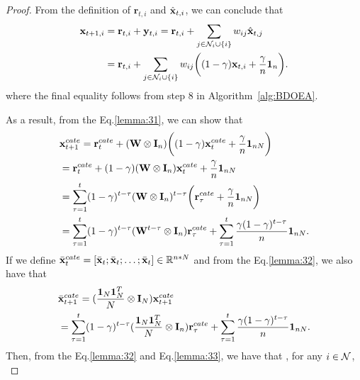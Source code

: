 		\begin{proof}
		From the definition of $\mathbf{r}_{t,i}$ and $\hat{\mathbf{x}}_{t,i}$, we can conclude that 
		\begin{equation}\label{lemma:31}
			\begin{aligned}
				\mathbf{x}_{t+1,i}&=\mathbf{r}_{t,i}+\mathbf{y}_{t,i}=\mathbf{r}_{t,i}+\sum_{j\in\mathcal{N}_{i}\cup\{i\}}w_{ij}\hat{\mathbf{x}}_{t,j}\\
				&=\mathbf{r}_{t,i}+\sum_{j\in\mathcal{N}_{i}\cup\{i\}}w_{ij}\bigg((1-\gamma)\mathbf{x}_{t,i}+\frac{\gamma}{n}\mathbf{1}_{n}\bigg).
			\end{aligned}		
		\end{equation} where the final equality follows from step 8 in Algorithm~\ref{alg:BDOEA}. 
		
		As a result, from the Eq.\eqref{lemma:31}, we can show that
		\begin{equation}\label{lemma:32}
			\begin{aligned}
				&\mathbf{x}_{t+1}^{cate}=\mathbf{r}_{t}^{cate}+(\mathbf{W}\otimes\mathbf{I}_{n})\bigg((1-\gamma)\mathbf{x}_{t}^{cate}+\frac{\gamma}{n}\mathbf{1}_{nN}\bigg)\\
				&=\mathbf{r}_{t}^{cate}+(1-\gamma)(\mathbf{W}\otimes\mathbf{I}_{n})\mathbf{x}_{t}^{cate}+\frac{\gamma}{n}\mathbf{1}_{nN}\\
				&=\sum_{\tau=1}^{t}(1-\gamma)^{t-\tau}(\mathbf{W}\otimes\mathbf{I}_{n})^{t-\tau}\bigg(\mathbf{r}_{\tau}^{cate}+\frac{\gamma}{n}\mathbf{1}_{nN}\bigg)\\
				&=\sum_{\tau=1}^{t}(1-\gamma)^{t-\tau}(\mathbf{W}^{t-\tau}\otimes\mathbf{I}_{n})\mathbf{r}_{\tau}^{cate}+\sum_{\tau=1}^{t}\frac{\gamma(1-\gamma)^{t-\tau}}{n}\mathbf{1}_{nN}.
			\end{aligned}
		\end{equation}
		If we define $\bar{\mathbf{x}}_{t}^{cate}=[\bar{\mathbf{x}}_{t};\bar{\mathbf{x}}_{t};\dots;\bar{\mathbf{x}}_{t}]\in\mathbb{R}^{n*N}$ and from the Eq.\eqref{lemma:32}, we also have that
		\begin{equation}\label{lemma:33}
			\begin{aligned}
				&\bar{\mathbf{x}}_{t+1}^{cate}=(\frac{\mathbf{1}_{N}\mathbf{1}_{N}^{T}}{N}\otimes\mathbf{I}_{N})\mathbf{x}_{t+1}^{cate}\\
				&=\sum_{\tau=1}^{t}(1-\gamma)^{t-\tau}(\frac{\mathbf{1}_{N}\mathbf{1}_{N}^{T}}{N}\otimes\mathbf{I}_{n})\mathbf{r}_{\tau}^{cate}+\sum_{\tau=1}^{t}\frac{\gamma(1-\gamma)^{t-\tau}}{n}\mathbf{1}_{nN}.
			\end{aligned}
		\end{equation}
		Then, from the Eq.\eqref{lemma:32} and Eq.\eqref{lemma:33}, we have that , for any $i\in\mathcal{N}$,
		\begin{equation}\label{lemma:34}

\end{equation}
\end{proof}
